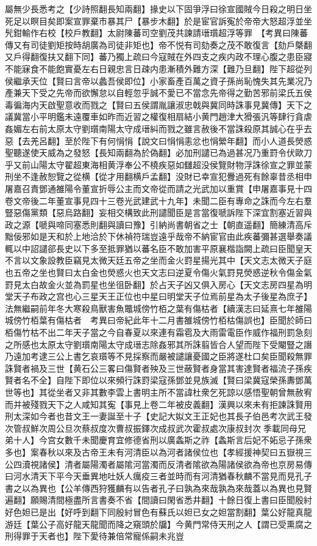 屬無少長悉考之【少詩照翻長知兩翻】掾史以下固爭浮曰徐宣國賊今日殺之明日坐死足以瞑目矣即案宣罪棄市暴其尸【暴步木翻】於是宦官訴寃於帝帝大怒超浮並坐髠鉗輸作右校【校戶教翻】太尉陳蕃司空劉茂共諫請瑨瓆超浮等罪　【考異曰陳蕃傳又有司徒劉矩按時胡廣為司徒非矩也】帝不悦有司劾奏之茂不敢復言【劾戶槩翻又戶得翻復扶又翻下同】蕃乃獨上疏曰今寇賊在外四支之疾内政不理心腹之患臣寢不能寐食不能飽實憂左右日親忠言日疎内患漸積外難方深【難乃旦翻】陛下超從列侯繼承天位【賢曰言帝以蠡吾侯即位】小家畜產百萬之資子孫尚恥愧失其先業况乃產兼天下受之先帝而欲懈怠以自輕忽乎誠不愛已不當念先帝得之勤苦邪前梁氏五侯毒徧海内天啟聖意收而戮之【賢曰五侯謂胤讓淑忠戟與冀同時誅事見冀傳】天下之議冀當小平明鑑未遠覆車如昨而近習之權復相扇結小黄門趙津大猾張汎等肆行貪虐姦媚左右前太原太守劉瓆南陽太守成瑨糾而戮之雖言赦後不當誅殺原其誠心在乎去惡【去羌呂翻】至於陛下有何悁悁【說文曰悁悁恚忿也悁縈年翻】而小人道長熒惑聖聽遂使天威為之發怒【長知兩翻為於偽翻】必加刑譴已為過甚况乃重罸令伏歐刀乎又前山陽太守翟超東海相黄浮奉公不橈疾惡如讎超没侯覽財物浮誅徐宣之罪並蒙刑坐不逢赦恕覽之從横【從才用翻横戶孟翻】没財已幸宣犯釁過死有餘辜昔丞相申屠嘉召責鄧通雒陽令董宣折辱公主而文帝從而請之光武加以重賞【申屠嘉事見十四卷文帝後二年董宣事見四十三卷光武建武十九年】未聞二臣有專命之誅而今左右羣豎惡傷黨類【惡烏路翻】妄相交構致此刑譴聞臣是言當復嗁訴陛下深宜割塞近習與政之源【嗁與啼同塞悉則翻與讀曰豫】引納尚書朝省之士【朝直遥翻】簡練清高斥黜佞邪如是天和於上地洽於下休禎符瑞豈遠乎哉帝不納宦官由此疾蕃彌甚選舉奏議輒以中詔譴郤長史以下多至抵罪猶以蕃名臣不敢加害平原襄楷詣闕上疏曰臣聞皇天不言以文象設教臣竊見太微天廷五帝之坐而金火罸星揚光其中【天文志太微天子庭也五帝之坐也賢曰太白金也熒惑火也天文志曰逆夏令傷火氣罸見熒惑逆秋令傷金氣罸見太白故金火並為罰星也坐徂卧翻】於占天子凶又俱入房心【天文志房四星為明堂天子布政之宫也心三星天王正位也中星曰明堂天子位焉前星為太子後星為庶子】法無繼嗣前年冬大寒殺鳥獸害魚鼈城傍竹栢之葉有傷枯者【續漢志曰延熹七年雒陽城傍竹栢葉有傷枯者　考異曰帝紀此年十二月書雒城傍竹栢枯傷誤也】臣聞於師曰栢傷竹枯不出二年天子當之今自春夏以來連有霜雹及大雨雷電臣作威作福刑罰急刻之所感也太原太守劉瓆南陽太守成瑨志除姦邪其所誅翦皆合人望而陛下受閹豎之譖乃遠加考逮三公上書乞哀瓆等不見採察而嚴被譴讓憂國之臣將遂杜口矣臣聞殺無罪誅賢者禍及三世【黄石公三畧曰傷賢者殃及三世蔽賢者身當其害達賢者福流子孫疾賢者名不全】自陛下即位以來頻行誅罸梁寇孫鄧並見族滅【賢曰梁冀寇榮孫夀鄧萬世等也】其從坐者又非其數李雲上書明主所不當諱杜衆乞死諒以感悟聖朝曾無赦宥而并被殘戮天下之人咸知其寃【事見上卷二年被皮義翻】漢興以來未有拒諫誅賢用刑太深如今者也昔文王一妻誕至十子【史記大姒文王正妃也其長子伯邑考次武王發次管叔鮮次周公旦次蔡叔度次曹叔振鐸次成叔武次霍叔處次康叔封次季載同母兄弟十人】今宫女數千未聞慶育宜修德省刑以廣螽斯之祚【螽斯言后妃不妬忌子孫衆多也】案春秋以來及古帝王未有河清臣以為河者諸侯位也【孝經援神契曰五嶽視三公四瀆視諸侯】清者屬陽濁者屬隂河當濁而反清者隂欲為陽諸侯欲為帝也京房易傳曰河水清天下平今天垂異地吐妖人癘疫三者並時而有河清猶春秋麟不當見而見孔子書之以為異也【公羊傳西狩獲麟有以告者孔子曰孰為來哉孰為來哉蓋以為異也見賢遍翻】願賜清間極盡所言書奏不省【間讀曰閑省悉井翻】十餘日復上書曰臣聞殷紂好色妲已是出【好呼到翻下同殷紂冒色有蘇氏以妲已女之妲當割翻】葉公好龍真龍游廷【葉公子高好龍天龍聞而降之窺頭於牖】今黄門常侍天刑之人【謂已受熏腐之刑得罪于天者也】陛下愛待兼倍常寵係嗣未兆豈